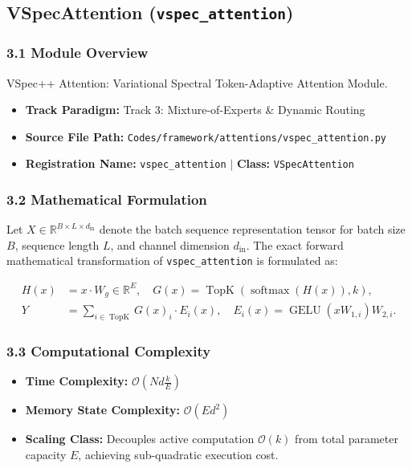 \subsection{VSpecAttention (\texttt{vspec\_attention})}
\label{sec:app_module_vspec_attention}

\subsubsection*{3.1 Module Overview}
VSpec++ Attention: Variational Spectral Token-Adaptive Attention Module.
\begin{itemize}
    \item \textbf{Track Paradigm:} Track 3: Mixture-of-Experts \& Dynamic Routing
    \item \textbf{Source File Path:} \texttt{Codes/framework/attentions/vspec\_attention.py}
    \item \textbf{Registration Name:} \texttt{vspec\_attention} $\mid$ \textbf{Class:} \texttt{VSpecAttention}
\end{itemize}

\subsubsection*{3.2 Mathematical Formulation}
Let $X \in \mathbb{R}^{B \times L \times d_{\text{in}}}$ denote the batch sequence representation tensor for batch size $B$, sequence length $L$, and channel dimension $d_{\text{in}}$. The exact forward mathematical transformation of \texttt{vspec\_attention} is formulated as:

\begin{align}
H(x) &= x \cdot W_g \in \mathbb{R}^{E}, \quad G(x) = \operatorname{TopK}\left(\operatorname{softmax}(H(x)), k\right), \\
Y &= \sum_{i \in \operatorname{TopK}} G(x)_i \cdot E_i(x), \quad E_i(x) = \operatorname{GELU}(x W_{1, i}) W_{2, i}.
\end{align}


\subsubsection*{3.3 Computational Complexity}
\begin{itemize}
    \item \textbf{Time Complexity:} $\mathcal{O}(N d \frac{k}{E})$
    \item \textbf{Memory State Complexity:} $\mathcal{O}(E d^2)$
    \item \textbf{Scaling Class:} Decouples active computation $\mathcal{O}(k)$ from total parameter capacity $E$, achieving sub-quadratic execution cost.
\end{itemize}

